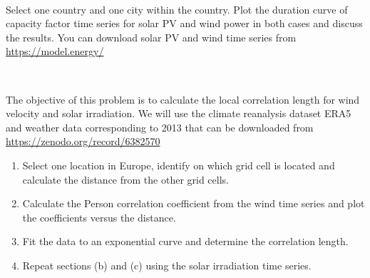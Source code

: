 \documentclass[10pt]{article}
\newenvironment{problem}[2][Problem]{\begin{trivlist}
\item[\hskip \labelsep {\bfseries #1}\hskip \labelsep {\bfseries #2.}]}{\end{trivlist}}
\begin{document}
\

\begin{problem}{1.4}
Select one country and one city within the country. Plot the duration curve of capacity factor time series for solar PV and wind power in both cases and discuss the results. You can download solar PV and wind time series from \url{https://model.energy/}
\end{problem}

\

\begin{problem}{1.5 (Optional)}

The objective of this problem is to calculate the local correlation length for wind velocity and solar irradiation. We will use the climate reanalysis dataset ERA5 and weather data corresponding to 2013 that can be downloaded from \url{https://zenodo.org/record/6382570}

\begin{enumerate}
\item[a)] Select one location in Europe, identify on which grid cell is located and calculate the distance from the other grid cells. 
\item[b)] Calculate the Person correlation coefficient from the wind time series and plot the coefficients versus the distance.
\item[c)] Fit the data to an exponential curve and determine the correlation length.
\item[d)] Repeat sections (b) and (c) using the solar irradiation time series.
\end{enumerate}


\end{problem}

\end{document}
